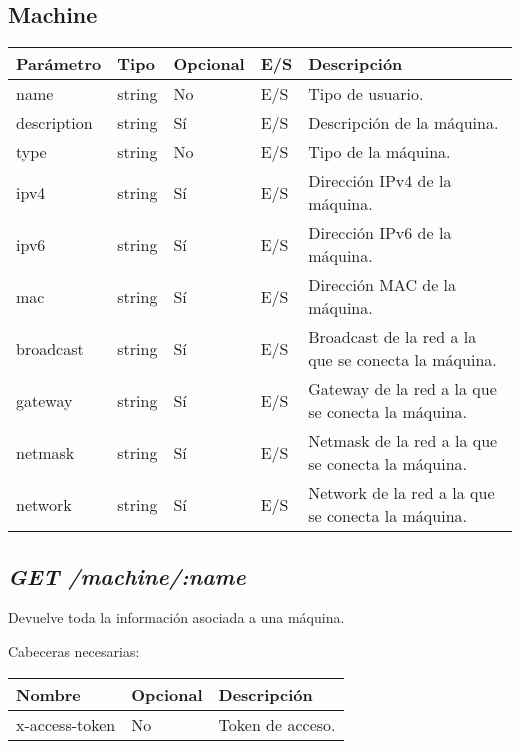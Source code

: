 \subsection{Machine}
\label{sec:maquina}
\begin{table}[h!]
	\centering
	\begin{adjustbox}{max width=\textwidth}
	\begin{tabularx}{\linewidth}{|l|l|l|l|L|}
		\hline
		Parámetro & Tipo & Opcional & E/S & Descripción \\ \hline
		name & string & No & E/S & Tipo de usuario. \\ \hline
		description & string & Sí & E/S & Descripción de la máquina. \\ \hline
		type & string & No & E/S & Tipo de la máquina. \\ \hline
		ipv4 & string & Sí & E/S & Dirección IPv4 de la máquina. \\ \hline
		ipv6 & string & Sí & E/S & Dirección IPv6 de la máquina. \\ \hline
		mac & string & Sí & E/S & Dirección MAC de la máquina. \\ \hline
		broadcast & string & Sí & E/S & Broadcast de la red a la que se conecta la máquina. \\ \hline
		gateway & string & Sí & E/S & Gateway de la red a la que se conecta la máquina. \\ \hline
		netmask & string & Sí & E/S & Netmask de la red a la que se conecta la máquina. \\ \hline
		network & string & Sí & E/S & Network de la red a la que se conecta la máquina. \\ \hline
	\end{tabularx}
\end{adjustbox}
\end{table}

\subsection{\textit{GET /machine/:name}}
Devuelve toda la información asociada a una máquina.

Cabeceras necesarias:
\begin{table}[h!]
	\centering
	\begin{adjustbox}{max width=\textwidth}
	\begin{tabular}{|l|l|l|}
		\hline
		Nombre & Opcional & Descripción \\ \hline
		x-access-token & No & Token de acceso. \\ \hline
	\end{tabular}
\end{adjustbox}
\end{table}

